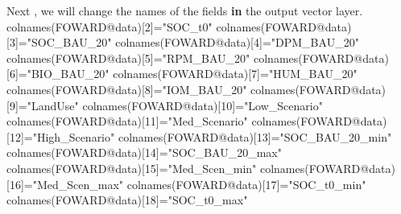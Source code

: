 \documentclass[
  10pt,
  b5paper,
]{book}
\newenvironment{Shaded}{\begin{snugshade}}{\end{snugshade}}
\newcommand{\ControlFlowTok}[1]{\textcolor[rgb]{0.13,0.29,0.53}{\textbf{#1}}}
\newcommand{\DecValTok}[1]{\textcolor[rgb]{0.00,0.00,0.81}{#1}}
\newcommand{\FunctionTok}[1]{\textcolor[rgb]{0.00,0.00,0.00}{#1}}
\newcommand{\NormalTok}[1]{#1}
\newcommand{\OtherTok}[1]{\textcolor[rgb]{0.56,0.35,0.01}{#1}}
\newcommand{\SpecialCharTok}[1]{\textcolor[rgb]{0.00,0.00,0.00}{#1}}
\newcommand{\StringTok}[1]{\textcolor[rgb]{0.31,0.60,0.02}{#1}}
\begin{document}
\begin{Shaded}
\begin{Highlighting}[]
\NormalTok{Next , we will change the names of the fields }\ControlFlowTok{in}\NormalTok{ the output vector layer.}
\FunctionTok{colnames}\NormalTok{(FOWARD}\SpecialCharTok{@}\NormalTok{data)[}\DecValTok{2}\NormalTok{]}\OtherTok{=}\StringTok{"SOC\_t0"}
\FunctionTok{colnames}\NormalTok{(FOWARD}\SpecialCharTok{@}\NormalTok{data)[}\DecValTok{3}\NormalTok{]}\OtherTok{=}\StringTok{"SOC\_BAU\_20"}
\FunctionTok{colnames}\NormalTok{(FOWARD}\SpecialCharTok{@}\NormalTok{data)[}\DecValTok{4}\NormalTok{]}\OtherTok{=}\StringTok{"DPM\_BAU\_20"}
\FunctionTok{colnames}\NormalTok{(FOWARD}\SpecialCharTok{@}\NormalTok{data)[}\DecValTok{5}\NormalTok{]}\OtherTok{=}\StringTok{"RPM\_BAU\_20"}
\FunctionTok{colnames}\NormalTok{(FOWARD}\SpecialCharTok{@}\NormalTok{data)[}\DecValTok{6}\NormalTok{]}\OtherTok{=}\StringTok{"BIO\_BAU\_20"}
\FunctionTok{colnames}\NormalTok{(FOWARD}\SpecialCharTok{@}\NormalTok{data)[}\DecValTok{7}\NormalTok{]}\OtherTok{=}\StringTok{"HUM\_BAU\_20"}
\FunctionTok{colnames}\NormalTok{(FOWARD}\SpecialCharTok{@}\NormalTok{data)[}\DecValTok{8}\NormalTok{]}\OtherTok{=}\StringTok{"IOM\_BAU\_20"}
\FunctionTok{colnames}\NormalTok{(FOWARD}\SpecialCharTok{@}\NormalTok{data)[}\DecValTok{9}\NormalTok{]}\OtherTok{=}\StringTok{"LandUse"}
\FunctionTok{colnames}\NormalTok{(FOWARD}\SpecialCharTok{@}\NormalTok{data)[}\DecValTok{10}\NormalTok{]}\OtherTok{=}\StringTok{"Low\_Scenario"}
\FunctionTok{colnames}\NormalTok{(FOWARD}\SpecialCharTok{@}\NormalTok{data)[}\DecValTok{11}\NormalTok{]}\OtherTok{=}\StringTok{"Med\_Scenario"}
\FunctionTok{colnames}\NormalTok{(FOWARD}\SpecialCharTok{@}\NormalTok{data)[}\DecValTok{12}\NormalTok{]}\OtherTok{=}\StringTok{"High\_Scenario"}
\FunctionTok{colnames}\NormalTok{(FOWARD}\SpecialCharTok{@}\NormalTok{data)[}\DecValTok{13}\NormalTok{]}\OtherTok{=}\StringTok{"SOC\_BAU\_20\_min"}
\FunctionTok{colnames}\NormalTok{(FOWARD}\SpecialCharTok{@}\NormalTok{data)[}\DecValTok{14}\NormalTok{]}\OtherTok{=}\StringTok{"SOC\_BAU\_20\_max"}
\FunctionTok{colnames}\NormalTok{(FOWARD}\SpecialCharTok{@}\NormalTok{data)[}\DecValTok{15}\NormalTok{]}\OtherTok{=}\StringTok{"Med\_Scen\_min"}
\FunctionTok{colnames}\NormalTok{(FOWARD}\SpecialCharTok{@}\NormalTok{data)[}\DecValTok{16}\NormalTok{]}\OtherTok{=}\StringTok{"Med\_Scen\_max"}
\FunctionTok{colnames}\NormalTok{(FOWARD}\SpecialCharTok{@}\NormalTok{data)[}\DecValTok{17}\NormalTok{]}\OtherTok{=}\StringTok{"SOC\_t0\_min"}
\FunctionTok{colnames}\NormalTok{(FOWARD}\SpecialCharTok{@}\NormalTok{data)[}\DecValTok{18}\NormalTok{]}\OtherTok{=}\StringTok{"SOC\_t0\_max"}
\end{Highlighting}
\end{Shaded}
\end{document}
